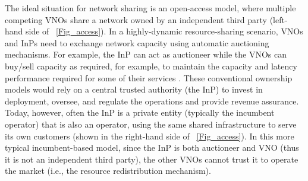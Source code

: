 


The ideal situation for network sharing is an open-access model, where multiple competing \acp{VNO} share a network owned by an independent third party (left-hand side of \figureautorefname~\ref{Fig_access}).
In a highly-dynamic resource-sharing scenario, \acp{VNO} and \acp{InP} need to exchange network capacity using automatic auctioning mechanisms. For example, the \ac{InP} can act as auctioneer while the VNOs can buy/sell capacity as required, for example, to maintain the capacity and latency performance required for some of their services \cite{8488596}. 
These conventional ownership models would rely on a central trusted authority (the \ac{InP}) to invest in deployment, oversee, and regulate the operations and provide revenue assurance.  
Today, however, often the \ac{InP} is a private entity (typically the incumbent operator) that is also an operator, using the same shared infrastructure to serve its own customers (shown in the right-hand side of \figureautorefname~\ref{Fig_access}). In this more typical incumbent-based model, since the \ac{InP} is both auctioneer and \ac{VNO} (thus it is not an independent third party), the other VNOs cannot trust it to operate the market (i.e., the resource redistribution mechanism).





